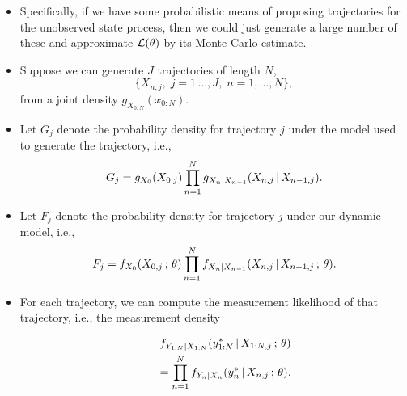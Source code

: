 \documentclass[]{article}
\begin{document}
\begin{itemize}
\item
  Specifically, if we have some probabilistic means of proposing
  trajectories for the unobserved state process, then we could just
  generate a large number of these and approximate \(\mathcal{L}(\theta)\) by
  its Monte Carlo estimate.
\item
  Suppose we can generate \(J\) trajectories of length \(N\),
  \[\big\{ X_{n,j}, \; j=1\,\dots,J,\;  n=1,\dots,N\big\},\] from a
  joint density \(g_{X_{0:N}}(x_{0:N})\).
\item
  Let \(G_j\) denote the probability density for trajectory \(j\) under
  the model used to generate the trajectory, i.e.,
  \[G_{j}= g_{X_0}(X_{0,j})\prod_{n=1}^N g_{X_n|X_{n-1}}(X_{n,j}{\, | \,} X_{n-1,j}).\]
\item
  Let \(F_j\) denote the probability density for trajectory \(j\) under
  our dynamic model, i.e.,
  \[F_{j}= f_{X_0}(X_{0,j}\, ; \,\theta)\prod_{n=1}^N f_{X_n|X_{n-1}}(X_{n,j}{\, | \,} X_{n-1,j}\, ; \,\theta).\]
\item
  For each trajectory, we can compute the measurement likelihood of that
  trajectory, i.e., the measurement density

  \begin{eqnarray} 
  &&f_{Y_{1:N}|X_{1:N}}(y_{1:N}^*{\, | \,} X_{1:N,j}\, ; \,\theta)
  \\
  &&\quad =\prod_{n=1}^{N} f_{Y_n|X_n}(y_n^*{\, | \,} X_{n,j}\, ; \,\theta).
  \end{eqnarray}


\end{itemize}
\end{document}
